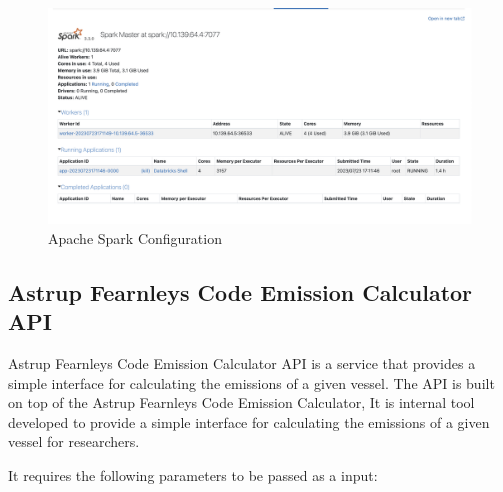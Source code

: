 \begin{figure}[h]
    \centering
    \includegraphics[width=1\textwidth]{images/spark_config.png}
    \caption{Apache Spark Configuration}
    \label{spark_config}
\end{figure}

\subsection{Astrup Fearnleys Code Emission Calculator API}

Astrup Fearnleys Code Emission Calculator API is a service that provides a simple interface for calculating the emissions of a given vessel.
The API is built on top of the Astrup Fearnleys Code Emission Calculator, It is internal tool developed to provide a simple interface for calculating the emissions of a given vessel for researchers.

It requires the following parameters to be passed as a input:

\newpage

